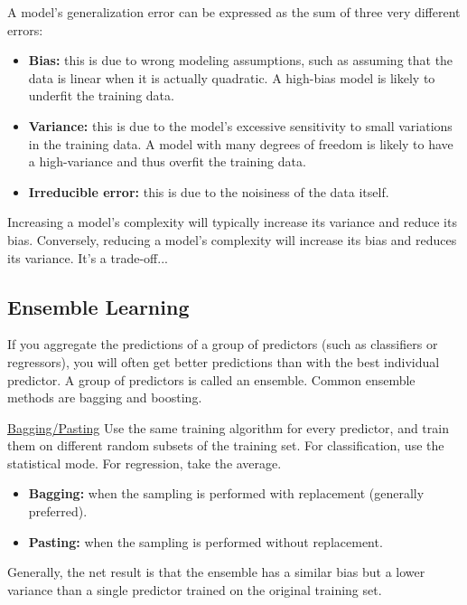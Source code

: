 A model's generalization error can be expressed as the sum of three very different errors:
\vspace{-3.0mm}
\begin{itemize}
\item
\textbf{Bias:}
this is due to wrong modeling assumptions, such as assuming that the data is linear when it is actually quadratic.
A high-bias model is likely to underfit the training data.
\item
\textbf{Variance:}
this is due to the model's excessive sensitivity to small variations in the training data.
A model with many degrees of freedom is likely to have a high-variance and thus overfit the training data.
\item
\textbf{Irreducible error:}
this is due to the noisiness of the data itself.
\end{itemize}

Increasing a model's complexity will typically increase its variance and reduce its bias.\newline
Conversely, reducing a model's complexity will increase its bias and reduces its variance.\newline
It's a trade-off...

\subsection{Ensemble Learning}

If you aggregate the predictions of a group of predictors (such as classifiers or regressors),
you will often get better predictions than with the best individual predictor.
% 
A group of predictors is called an ensemble.
Common ensemble methods are bagging and boosting.\newline

\underline{Bagging/Pasting}\newline
Use the same training algorithm for every predictor,
and train them on different random subsets of the training set.
For classification, use the statistical mode.
For regression, take the average.
\vspace{-3.0mm}
\begin{itemize}
\item
\textbf{Bagging:} when the sampling is performed with replacement (generally preferred).
\item
\textbf{Pasting:} when the sampling is performed without replacement.
\end{itemize}
%
\vspace{-3.0mm}
Generally, the net result is that the ensemble has a similar bias but a lower variance
than a single predictor trained on the original training set.


